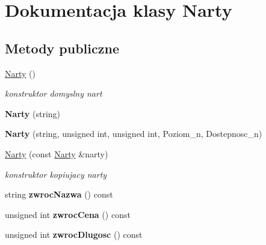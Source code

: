 \hypertarget{class_narty}{}\section{Dokumentacja klasy Narty}
\label{class_narty}
\subsection*{Metody publiczne}
\begin{DoxyCompactItemize}
\item 
\mbox{\label{class_narty_a312e42f1c67b9eb1307ae28551d5a568}} 
\hyperlink{class_narty_a312e42f1c67b9eb1307ae28551d5a568}{Narty} ()
\begin{DoxyCompactList}\small\item\em konstruktor domyslny nart \end{DoxyCompactList}\item 
\mbox{\label{class_narty_a0e97c71362fec6e6495f35750e1c45d2}} 
{\bfseries Narty} (string)
\item 
\mbox{\label{class_narty_a061922fefe4e2cc8da8daf66ce0070fd}} 
{\bfseries Narty} (string, unsigned int, unsigned int, Poziom\+\_\+n, Dostepnosc\+\_\+n)
\item 
\mbox{\label{class_narty_af5629023cde81ccb70cef0d02d315347}} 
\hyperlink{class_narty_af5629023cde81ccb70cef0d02d315347}{Narty} (const \hyperlink{class_narty}{Narty} \&narty)
\begin{DoxyCompactList}\small\item\em konstruktor kopiujacy narty \end{DoxyCompactList}\item 
\mbox{\label{class_narty_a704912bf1923302796ed7465678d4664}} 
string {\bfseries zwroc\+Nazwa} () const
\item 
\mbox{\label{class_narty_a417482bac2097c29ce9c74c721ba7854}} 
unsigned int {\bfseries zwroc\+Cena} () const
\item 
\mbox{\label{class_narty_a16205402be7796d3bbdbb9b7eb34507f}} 
unsigned int {\bfseries zwroc\+Dlugosc} () const
\item 
\mbox{\label{class_narty_a9e9f486ea6e7aee2b3ea765bb8c126c1}} 

\end{DoxyCompactItemize}
